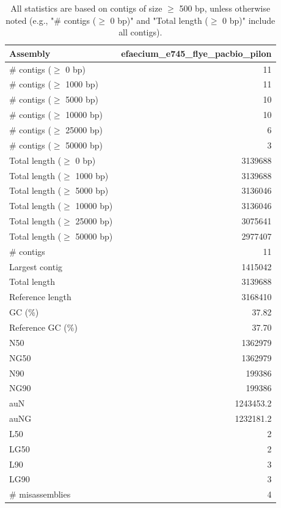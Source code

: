 \documentclass[12pt,a4paper]{article}
\begin{document}
\begin{table}[ht]
\begin{center}
\caption{All statistics are based on contigs of size $\geq$ 500 bp, unless otherwise noted (e.g., "\# contigs ($\geq$ 0 bp)" and "Total length ($\geq$ 0 bp)" include all contigs).}
\begin{tabular}{|l*{1}{|r}|}
\hline
Assembly & efaecium\_e745\_flye\_pacbio\_pilon \\ \hline
\# contigs ($\geq$ 0 bp) & 11 \\ \hline
\# contigs ($\geq$ 1000 bp) & 11 \\ \hline
\# contigs ($\geq$ 5000 bp) & 10 \\ \hline
\# contigs ($\geq$ 10000 bp) & 10 \\ \hline
\# contigs ($\geq$ 25000 bp) & 6 \\ \hline
\# contigs ($\geq$ 50000 bp) & 3 \\ \hline
Total length ($\geq$ 0 bp) & 3139688 \\ \hline
Total length ($\geq$ 1000 bp) & 3139688 \\ \hline
Total length ($\geq$ 5000 bp) & 3136046 \\ \hline
Total length ($\geq$ 10000 bp) & 3136046 \\ \hline
Total length ($\geq$ 25000 bp) & 3075641 \\ \hline
Total length ($\geq$ 50000 bp) & 2977407 \\ \hline
\# contigs & 11 \\ \hline
Largest contig & 1415042 \\ \hline
Total length & 3139688 \\ \hline
Reference length & 3168410 \\ \hline
GC (\%) & 37.82 \\ \hline
Reference GC (\%) & 37.70 \\ \hline
N50 & 1362979 \\ \hline
NG50 & 1362979 \\ \hline
N90 & 199386 \\ \hline
NG90 & 199386 \\ \hline
auN & 1243453.2 \\ \hline
auNG & 1232181.2 \\ \hline
L50 & 2 \\ \hline
LG50 & 2 \\ \hline
L90 & 3 \\ \hline
LG90 & 3 \\ \hline
\# misassemblies & 4 \\ \hline

\end{tabular}
\end{center}
\end{table}
\end{document}
